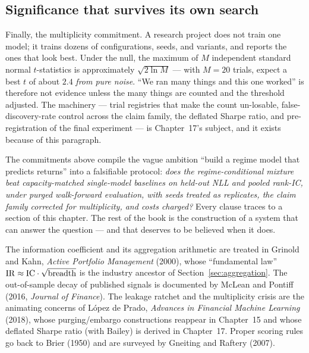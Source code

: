 \subsection{Significance that survives its own search}

Finally, the multiplicity commitment. A research project does not train one
model; it trains dozens of configurations, seeds, and variants, and reports
the ones that look best. Under the null, the maximum of $M$ independent
standard normal $t$-statistics is approximately $\sqrt{2 \ln M}$ --- with
$M = 20$ trials, expect a best $t$ of about $2.4$ \emph{from pure noise}.
``We ran many things and this one worked'' is therefore not evidence unless
the many things are counted and the threshold adjusted. The machinery ---
trial registries that make the count un-losable, false-discovery-rate
control across the claim family, the deflated Sharpe ratio, and
pre-registration of the final experiment --- is Chapter~17's subject, and it
exists because of this paragraph.

\begin{engineering}
The commitments above compile the vague ambition ``build a regime model that
predicts returns'' into a falsifiable protocol: \emph{does the
regime-conditional mixture beat capacity-matched single-model baselines on
held-out NLL and pooled rank-IC, under purged walk-forward evaluation, with
seeds treated as replicates, the claim family corrected for multiplicity,
and costs charged?} Every clause traces to a section of this chapter. The
rest of the book is the construction of a system that can answer the
question --- and that deserves to be believed when it does.
\end{engineering}

\begin{origins}
The information coefficient and its aggregation arithmetic are treated in
Grinold and Kahn, \emph{Active Portfolio Management} (2000), whose
``fundamental law'' $\mathrm{IR} \approx \mathrm{IC} \cdot \sqrt{\text{breadth}}$ is
the industry ancestor of Section~\ref{sec:aggregation}. The out-of-sample
decay of published signals is documented by McLean and Pontiff (2016,
\emph{Journal of Finance}). The leakage ratchet and the multiplicity crisis
are the animating concerns of L\'opez de Prado, \emph{Advances in Financial
Machine Learning} (2018), whose purging/embargo constructions reappear in
Chapter~15 and whose deflated Sharpe ratio (with Bailey) is derived in
Chapter~17. Proper scoring rules go back to Brier (1950) and are surveyed by
Gneiting and Raftery (2007).
\end{origins}

